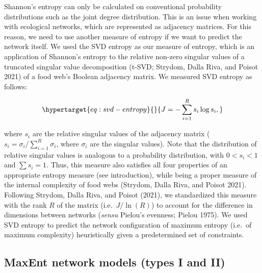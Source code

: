 \documentclass[11pt]{article}
\begin{document}
Shannon's entropy can only be calculated on conventional probability
distributions such as the joint degree distribution. This is an issue
when working with ecological networks, which are represented as
adjacency matrices. For this reason, we need to use another measure of
entropy if we want to predict the network itself. We used the SVD
entropy as our measure of entropy, which is an application of Shannon's
entropy to the relative non-zero singular values of a truncated singular
value decomposition (t-SVD; Strydom, Dalla Riva, and Poisot 2021) of a
food web's Boolean adjacency matrix. We measured SVD entropy as follows:

\begin{equation}\protect\hypertarget{eq:svd-entropy}{}{J = -\sum_{i=1}^R s_i \log s_i,}\label{eq:svd-entropy}\end{equation}

where \(s_i\) are the relative singular values of the adjacency matrix
(\(s_i = \sigma_i / \sum_{i = 1}^R \sigma_i\), where \(\sigma_i\) are
the singular values). Note that the distribution of relative singular
values is analogous to a probability distribution, with \(0 < s_i < 1\)
and \(\sum s_i = 1\). Thus, this measure also satisfies all four
properties of an appropriate entropy measure (see introduction), while
being a proper measure of the internal complexity of food webs (Strydom,
Dalla Riva, and Poisot 2021). Following Strydom, Dalla Riva, and Poisot
(2021), we standardized this measure with the rank \(R\) of the matrix
(i.e.~\(J / \ln(R)\)) to account for the difference in dimensions
between networks (\emph{sensu} Pielou's evenness; Pielou 1975). We used
SVD entropy to predict the network configuration of maximum entropy
(i.e.~of maximum complexity) heuristically given a predetermined set of
constraints.

\hypertarget{maxent-network-models-types-i-and-ii}{%
\subsection{MaxEnt network models (types I and
II)}\label{maxent-network-models-types-i-and-ii}}
\end{document}
